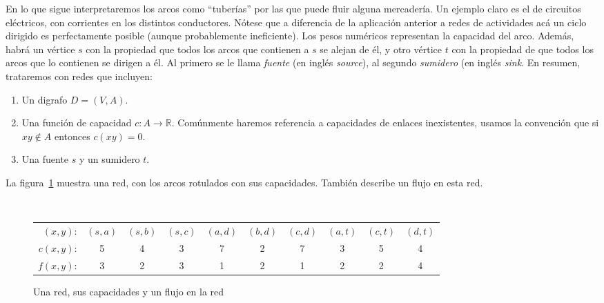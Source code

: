   En lo que sigue interpretaremos los arcos como ``tuberías''
  por las que puede fluir alguna mercadería.
  Un  ejemplo claro es el de circuitos eléctricos,%
  con corrientes en los distintos conductores.
  Nótese que a diferencia de la aplicación anterior
  a redes de actividades
  acá un ciclo dirigido es perfectamente posible
  (aunque probablemente ineficiente).
  Los pesos numéricos representan la capacidad del arco.
  Además,
  habrá un vértice \(s\) con la propiedad que todos los arcos
  que contienen a \(s\) se alejan de él,
  y otro vértice \(t\)
  con la propiedad de que todos los arcos que lo contienen
  se dirigen a él.
  Al primero se le llama \emph{fuente}%
    (en inglés \emph{\foreignlanguage{english}{source}}),%
  al segundo \emph{sumidero}%
    (en inglés \emph{\foreignlanguage{english}{sink}}.%
  En resumen,
  trataremos con redes que incluyen:
  \begin{enumerate}[label=(\roman{*})]
  \item
    Un digrafo \(D = (V, A)\).
  \item
    Una función de capacidad \(c \colon A \rightarrow \mathbb{R}\).
    Comúnmente haremos referencia a capacidades
    de enlaces inexistentes,
    usamos la convención que si \(x y \notin A\)
    entonces \(c(x y) = 0\).
  \item
    Una fuente \(s\) y un sumidero \(t\).
  \end{enumerate}
  La figura~\ref{fig:flow-network} muestra una red,
  con los arcos rotulados con sus capacidades.
  También describe un flujo en esta red.
  \begin{figure}[htbp]
    \centering
    \\[2ex]
    \begin{tabular}[c]{r*{9}{c}}
      \((x, y)\):  & \((s, a)\) & \((s, b)\) & \((s, c)\) & \((a, d)\)
		   & \((b, d)\) & \((c, d)\) & \((a, t)\) & \((c, t)\)
		   & \((d, t)\) \\
      \(c(x, y)\): &	      5 &	   4 &		3 &	     7
		   &	      2 &	   7 &		3 &	     5
		   &	      4 \\
      \(f(x, y)\): &	      3 &	   2 &		3 &	     1
		   &	      2 &	   1 &		2 &	     2
		   &	      4
    \end{tabular}
    \caption{Una red, sus capacidades y un flujo en la red}
    \label{fig:flow-network}
  \end{figure}

